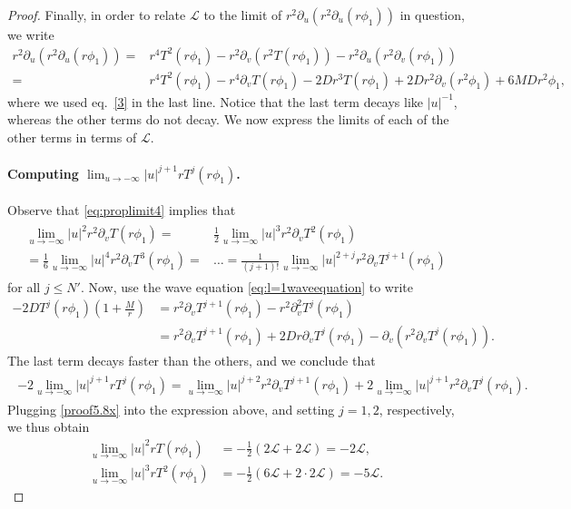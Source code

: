\documentclass[11pt,english]{article}
\numberwithin{equation}{section}
\theoremstyle{remark}
\theoremstyle{plain}
\newenvironment{nalign}{
    \begin{equation}
    \begin{aligned}
}{
    \end{aligned}
    \end{equation}
    \ignorespacesafterend
}
\theoremstyle{remark}
\newcommand{\pu}{\partial_u}
\newcommand{\pv}{\partial_v}
\renewcommand{\(}{\left(}
\renewcommand{\)}{\right)}
\begin{document}
\begin{proof}
Finally, in order to relate $\mathcal L$ to the limit of $r^2\pu(r^2\pu(r\phi_1))$ in question, we write
\begin{nalign}\label{eq:tl:pupu}
r^2\pu(r^2\pu(r\phi_1))=&r^4 T^2(r\phi_1)-r^2\pv(r^2 T(r\phi_1))-r^2\pu(r^2\pv(r\phi_1))\\
=&r^4 T^2(r\phi_1)-r^4\pv T(r\phi_1)-2D r^3 T(r\phi_1)+2D r^2\pv(r^2\phi_1)+6MD r^2\phi_1,
\end{nalign}
where we used eq.\ \eqref{3} in the last line. Notice that the last term decays like $|u|^{-1}$, whereas the other terms do not decay. We now express the limits of each of the other terms in terms of $\mathcal{L}$.
\paragraph{Computing $\lim_{u\to-\infty} |u|^{j+1}rT^j(r\phi_1)$.}
Observe that \eqref{eq:proplimit4} implies that 
\begin{align}\label{proof5.8x}
\begin{split}
\lim_{u\to-\infty} |u|^2r^2\pv T(r\phi_1)=&\frac12\lim_{u\to-\infty} |u|^3r^2\pv T^2(r\phi_1)\\
=\frac16 \lim_{u\to-\infty}|u|^4r^2\pv T^3(r\phi_1)
=&\dots=\frac{1}{(j+1)!}\lim_{u\to-\infty} |u|^{2+j}r^2\pv T^{j+1}(r\phi_1)
\end{split}
\end{align}
for all $j\leq N'$.
Now, use the wave equation \eqref{eq:l=1waveequation} to write
\begin{align*}
-2D T^j(r\phi_1)\left(1+\frac{M}{r}\right)&=r^2\pv T^{j+1}(r\phi_1)-r^2\pv^2 T^{j}(r\phi_1)\\
&=r^2\pv T^{j+1}(r\phi_1)+2Dr\pv T^j(r\phi_1)-\pv(r^2\pv T^j(r\phi_1)).
\end{align*}
The last term decays faster than the others, and we conclude that
\begin{align}
\begin{split}
-2\lim_{u\to-\infty} |u|^{j+1}r T^j(r\phi_1)
=\lim_{u\to-\infty}|u|^{j+2}r^2\pv T^{j+1}(r\phi_1) +2\lim_{u\to-\infty}|u|^{j+1}r^2\pv T^j(r\phi_1).
\end{split}
\end{align}
Plugging \eqref{proof5.8x} into the expression above, and setting $j=1, 2$, respectively, we thus obtain
\begin{align}\label{proof5.8y}
\lim_{u\to-\infty}|u|^2r T(r\phi_1) &=-\frac{1}{2}(2\mathcal L+2\mathcal L)=-2\mathcal{L},\\
\lim_{u\to-\infty}|u|^3 r T^2(r\phi_1)&=-\frac12 (6\mathcal L+2\cdot 2\mathcal L)=-5\mathcal{L}.\label{proof5.8yy}
\end{align}

\end{proof}
\end{document}
